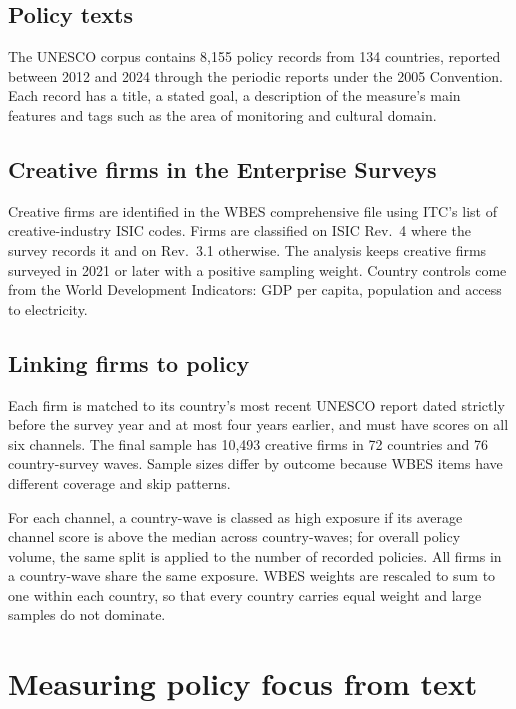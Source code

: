 \documentclass[11pt]{article}
\begin{document}
\subsection{Policy texts}

The UNESCO corpus contains 8,155 policy records from 134 countries, reported between 2012 and 2024 through the periodic reports under the 2005 Convention. Each record has a title, a stated goal, a description of the measure's main features and tags such as the area of monitoring and cultural domain.

\subsection{Creative firms in the Enterprise Surveys}

Creative firms are identified in the WBES comprehensive file using ITC's list of creative-industry ISIC codes. Firms are classified on ISIC Rev.~4 where the survey records it and on Rev.~3.1 otherwise. The analysis keeps creative firms surveyed in 2021 or later with a positive sampling weight. Country controls come from the World Development Indicators: GDP per capita, population and access to electricity.

\subsection{Linking firms to policy}

Each firm is matched to its country's most recent UNESCO report dated strictly before the survey year and at most four years earlier, and must have scores on all six channels. The final sample has 10,493 creative firms in 72 countries and 76 country-survey waves. Sample sizes differ by outcome because WBES items have different coverage and skip patterns.

For each channel, a country-wave is classed as high exposure if its average channel score is above the median across country-waves; for overall policy volume, the same split is applied to the number of recorded policies. All firms in a country-wave share the same exposure. WBES weights are rescaled to sum to one within each country, so that every country carries equal weight and large samples do not dominate.

\section{Measuring policy focus from text}\label{sec:text}
\end{document}
